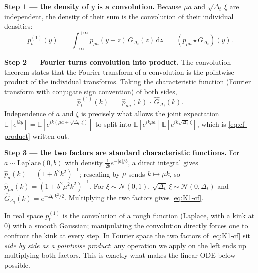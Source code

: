\documentclass[11pt]{article}
\theoremstyle{definition}
\newcommand{\E}{\mathbb{E}}
\newcommand{\Detl}{\Delta_t}
\begin{document}
\begin{derivation}
\textbf{Step 1 --- the density of \(y\) is a convolution.} Because
\(\mu a\) and \(\sqrt{\Detl}\, \xi\) are independent, the density of
their sum is the convolution of their individual densities:
\begin{equation}
    p_t^{(1)}(y)
    \;=\; \int_{-\infty}^{+\infty}
            p_{\mu a}(y - z)\, G_{\Detl}(z)\, \mathrm dz
    \;=\; (p_{\mu a} \star G_{\Detl})(y).
\end{equation}

\textbf{Step 2 --- Fourier turns convolution into product.} The
convolution theorem states that the Fourier transform of a convolution
is the pointwise product of the individual transforms. Taking the
characteristic function (Fourier transform with conjugate sign
convention) of both sides,
\begin{equation}\label{eq:cf-product}
    \widehat p_t^{\,(1)}(k)
    \;=\;
    \widehat p_{\mu a}(k)\,\cdot\, \widehat G_{\Detl}(k).
\end{equation}
Independence of \(a\) and \(\xi\) is precisely what allows the joint
expectation \(\E[e^{i k y}] = \E[e^{i k (\mu a + \sqrt{\Detl}\, \xi)}]\)
to split into \(\E[e^{i k \mu a}]\, \E[e^{i k \sqrt{\Detl}\, \xi}]\),
which is \eqref{eq:cf-product} written out.

\textbf{Step 3 --- the two factors are standard characteristic
functions.} For \(a \sim \mathrm{Laplace}(0, b)\) with density
\(\tfrac{1}{2 b} e^{-|a|/b}\), a direct integral gives
\(\widehat p_a(k) = (1 + b^2 k^2)^{-1}\); rescaling by \(\mu\) sends
\(k \mapsto \mu k\), so
\(\widehat p_{\mu a}(k) = (1 + b^2 \mu^2 k^2)^{-1}\).
For \(\xi \sim \mathcal N(0, 1)\), \(\sqrt{\Detl}\, \xi \sim
\mathcal N(0, \Detl)\) and \(\widehat G_{\Detl}(k) = e^{-\Detl\,
k^2 / 2}\). Multiplying the two factors gives \eqref{eq:K1-cf}.
\end{derivation}

\begin{intuition}
In real space \(p_t^{(1)}\) is the convolution of a rough function
(Laplace, with a kink at \(0\)) with a smooth Gaussian; manipulating
the convolution directly forces one to confront the kink at every
step. In Fourier space the two factors of \eqref{eq:K1-cf} sit
\emph{side by side as a pointwise product}: any operation we apply on
the left ends up multiplying both factors. This is exactly what makes
the linear ODE below possible.
\end{intuition}
\end{document}
